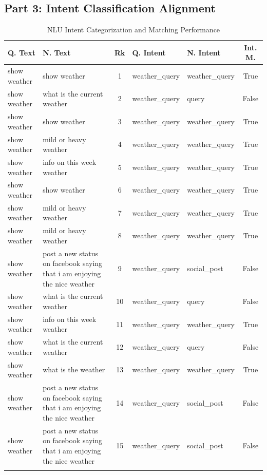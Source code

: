 \subsection*{Part 3: Intent Classification Alignment}
{\small
\begin{longtable}{p{3.8cm} p{3.8cm} c ll c}
\caption{NLU Intent Categorization and Matching Performance} \\
\toprule
\textbf{Q. Text} & \textbf{N. Text} & \textbf{Rk} & \textbf{Q. Intent} & \textbf{N. Intent} & \textbf{Int. M.} \\
\midrule
show weather & show weather & 1 & weather\_query & weather\_query & True \\
show weather & what is the current weather & 2 & weather\_query & query & False \\
show weather & show weather & 3 & weather\_query & weather\_query & True \\
show weather & mild or heavy weather & 4 & weather\_query & weather\_query & True \\
show weather & info on this week weather & 5 & weather\_query & weather\_query & True \\
show weather & show weather & 6 & weather\_query & weather\_query & True \\
show weather & mild or heavy weather & 7 & weather\_query & weather\_query & True \\
show weather & mild or heavy weather & 8 & weather\_query & weather\_query & True \\
show weather & post a new status on facebook saying that i am enjoying the nice weather & 9 & weather\_query & social\_post & False \\
show weather & what is the current weather & 10 & weather\_query & query & False \\
show weather & info on this week weather & 11 & weather\_query & weather\_query & True \\
show weather & what is the current weather & 12 & weather\_query & query & False \\
show weather & what is the weather & 13 & weather\_query & weather\_query & True \\
show weather & post a new status on facebook saying that i am enjoying the nice weather & 14 & weather\_query & social\_post & False \\
show weather & post a new status on facebook saying that i am enjoying the nice weather & 15 & weather\_query & social\_post & False \\
\midrule
 &  &  &  &  & \\ %

\end{longtable}}
